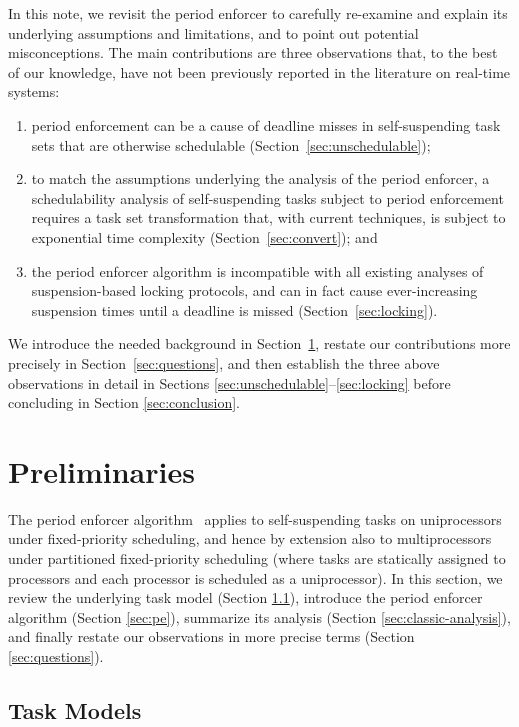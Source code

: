 In this note, we revisit the period enforcer \cite{Raj:suspension1991} to carefully re-examine and explain its underlying assumptions and limitations, and to point out potential misconceptions.  The main contributions are three observations that, to the best of our knowledge, have not been previously reported in the literature on real-time systems:
\begin{enumerate}
	\item period enforcement can be a cause of deadline misses in self-suspending task sets that are otherwise schedulable (Section~\ref{sec:unschedulable}); 
	\item to match the assumptions underlying the analysis of the period enforcer, a schedulability analysis of self-suspending tasks subject to period enforcement requires a task set  transformation that, with current techniques, is subject to exponential time complexity (Section~\ref{sec:convert}); and
	\item the period enforcer algorithm is incompatible with all existing analyses of suspension-based locking protocols, and can in fact cause ever-increasing suspension times until a deadline is missed (Section~\ref{sec:locking}).
\end{enumerate}


We introduce the needed background in Section~\ref{sec:prelim}, restate our contributions more precisely in Section~\ref{sec:questions}, and then establish the three above  observations in detail in Sections \ref{sec:unschedulable}--\ref{sec:locking} before concluding in Section \ref{sec:conclusion}.

\section{Preliminaries}
\label{sec:prelim}

The period enforcer algorithm~\cite{Raj:suspension1991} applies to self-suspending tasks on uniprocessors under fixed-priority scheduling, and hence by extension also to multiprocessors under partitioned fixed-priority scheduling (where tasks are statically assigned to processors and each processor is scheduled as a uniprocessor). In this section, we review the underlying task model (Section \ref{sec:taskmodel}), introduce the period enforcer algorithm (Section \ref{sec:pe}), summarize its analysis (Section \ref{sec:classic-analysis}), and finally restate our observations in more precise terms (Section \ref{sec:questions}).

\subsection{Task Models}
\label{sec:taskmodel}

